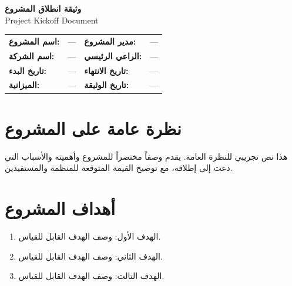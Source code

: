 \documentclass[11pt,a4paper]{article}
\begin{document}
\begin{center}
{\LARGE\bfseries وثيقة انطلاق المشروع}\\[0.3em]
{\large Project Kickoff Document}\\[1em]
\end{center}

\begin{table}[H]
\centering
\renewcommand{\arraystretch}{1.4}
\begin{tabularx}{\textwidth}{L{3.5cm} X L{3.5cm} X}
\toprule
\textbf{اسم المشروع:} & --- & \textbf{مدير المشروع:} & --- \\
\textbf{اسم الشركة:} & --- & \textbf{الراعي الرئيسي:} & --- \\
\textbf{تاريخ البدء:} & --- & \textbf{تاريخ الانتهاء:} & --- \\
\textbf{الميزانية:} & --- & \textbf{تاريخ الوثيقة:} & --- \\
\bottomrule
\end{tabularx}
\end{table}

\vspace{1em}

\section{نظرة عامة على المشروع}
\label{sec:overview}

هذا نص تجريبي للنظرة العامة. يقدم وصفاً مختصراً للمشروع وأهميته والأسباب التي دعت إلى إطلاقه، مع توضيح القيمة المتوقعة للمنظمة والمستفيدين.

\section{أهداف المشروع}
\label{sec:objectives}

\begin{enumerate}
    \item الهدف الأول: وصف الهدف القابل للقياس.
    \item الهدف الثاني: وصف الهدف القابل للقياس.
    \item الهدف الثالث: وصف الهدف القابل للقياس.
\end{enumerate}
\end{document}
